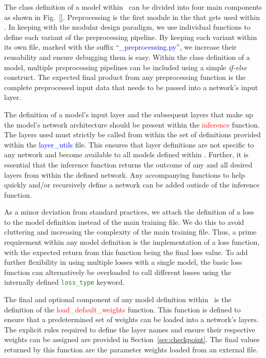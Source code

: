\documentclass{llncs}
\begin{document}
The class definition of a model within \acro~can be divided into four main components as shown in Fig.~\ref{}.
Preprocessing is the first module in the \model that gets used within \data.
In keeping with the modular design paradigm, we use individual functions to define each variant of the preprocessing pipeline.
By keeping each variant within its own file, marked with the suffix ``\textcolor{blue}{\_preprocessing.py}'', we increase their reusability and ensure debugging them is easy.
Within the class definition of a model, multiple preprocessing pipelines can be included using a simple \textit{if-else} construct.
The expected final product from any preprocessing function is the complete preprocessed input data that needs to be passed into a network's input layer.

The definition of a model's input layer and the subsequent layers that make up the model's network architecture should be present within the \textcolor{red}{inference} function.
The layers used must strictly be called from within the set of definitions provided within the \textcolor{blue}{layer\_utils} file.
This ensures that layer definitions are not specific to any network and become available to all models defined within \acro.
Further, it is essential that the inference function returns the outcome of any and all desired layers from within the defined network.
Any accompanying functions to help quickly and/or recursively define a network can be added outisde of the inference function.


As a minor deviation from standard practices, we attach the definition of a loss to the model definition instead of the main training file.
We do this to avoid cluttering and increasing the complexity of the main training file.
Thus, a prime requirement within any model definition is the implementation of a loss function, with the expected return from this function being the final loss value.
To add further flexibility in using multiple losses with a single model, the basic loss function can alternatively be overloaded to call different losses using the internally defined \texttt{\textcolor{ForestGreen}{loss\_type}} keyword.

The final and optional component of any model definition within \acro~is the definition of the \textcolor{red}{load\_default\_weights} function.
This function is defined to ensure that a predetermined set of weights can be loaded into a network's layers.
The explicit rules required to define the layer names and ensure their respective weights can be assigned are provided in Section~\ref{sec:checkpoint}.
The final values returned by this function are the parameter weights loaded from an external file.
\end{document}
